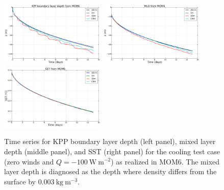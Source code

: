 \begin{figure}[h!t]
\begin{center}
\includegraphics[angle=0,width=5cm]{./figs/MOM6/cooling_KPP_MOM6_bldepth.png}
\includegraphics[angle=0,width=5cm]{./figs/MOM6/cooling_KPP_MOM6_mld.png}
\includegraphics[angle=0,width=5cm]{./figs/MOM6/cooling_KPP_MOM6_SST.png}
\caption[KPP BL depth, ML depth, and SST from MOM6 for cooling
test]{\sf Time series for KPP boundary layer depth (left panel), mixed
  layer depth (middle panel), and SST (right panel) for the cooling
  test case (zero winds and $Q=-100~\mbox{W}~\mbox{m}^{-2}$) as
  realized in MOM6.  The mixed layer depth is diagnosed as the depth
  where density differs from the surface by
  $0.003~\mbox{kg}~\mbox{m}^{-3}.$}
\label{fig:MOM6_SST_bldepth-cooling}
\end{center}
\end{figure}

